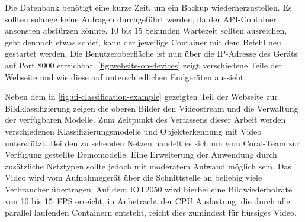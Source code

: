 Die Datenbank benötigt eine kurze Zeit,
um ein Backup wiederherzustellen.
Es sollten solange keine Anfragen durchgeführt werden,
da der API-Container ansonsten abstürzen könnte.
10 bis 15 Sekunden Wartezeit sollten ausreichen, geht dennoch etwas schief,
kann der jeweilige Container mit
dem Befehl  neu gestartet werden.
Die Benutzeroberfläche ist nun über die IP-Adresse des Geräts
auf Port 8000 erreichbar.
\autoref{fig:website-on-devices} zeigt verschiedene
Teile der Webseite und wie diese auf unterschiedlichen Endgeräten aussieht.
\newpage


\noindent
Neben dem in \autoref{fig:ui-classification-example} gezeigten
Teil der Webseite zur Bildklassifizierung zeigen die
oberen Bilder den Videostream und die Verwaltung der verfügbaren
Modelle. Zum Zeitpunkt des Verfassens dieser Arbeit werden
verschiedenen Klassifizierungsmodelle und Objekterkennung
mit Video unterstützt. Bei den zu sehenden Netzen
handelt es sich um vom Coral-Team zur Verfügung gestellte
Demomodelle. Eine Erweiterung der Anwendung
durch zusätzliche Netztypen sollte
jedoch mit moderatem Aufwand möglich sein.
Das Video wird vom Aufnahmegerät über die Schnittstelle
an beliebig viele Verbraucher übertragen.
Auf dem IOT2050 wird hierbei eine
Bildwiederholrate von 10 bis \qty{15}{FPS} erreicht,
in Anbetracht der CPU Auslastung, die durch alle
parallel laufenden Containern entsteht,
reicht dies zumindest für flüssiges Video.